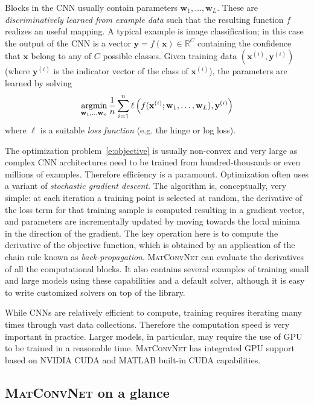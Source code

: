 \documentclass[12pt]{article}
\newcommand{\real}{\mathbb{R}}
\newcommand{\vlnn}{\textsc{MatConvNet}\xspace}
\newcommand{\bx}{\mathbf{x}}
\newcommand{\by}{\mathbf{y}}
\newcommand{\bw}{\mathbf{w}}
\newcommand{\argmin}{\operatornamewithlimits{argmin}}
\begin{document}
Blocks in the CNN usually contain parameters $\bw_1,\dots,\bw_L$. These are \emph{discriminatively learned from example data} such that the resulting function $f$ realizes an useful mapping. A typical example is image classification; in this case the output of the CNN is a vector $\by=f(\bx)\in\real^C$ containing the confidence that $\bx$ belong to any of $C$ possible classes. Given training data $(\bx^{(i)},\by^{(i)})$ (where $\by^{(i)}$ is the indicator vector of the class of $\bx^{(i)}$), the parameters are learned by solving
\begin{equation}\label{e:objective}
 \argmin_{\bw_1,\dots\bw_n}
 \frac{1}{n}\sum_{i=1}^n
 \ell\left(
 f(\bx^{(i)};\bw_1,\dots,\bw_L),
 \by^{(i)}
 \right)
\end{equation}
where $\ell$ is a suitable \emph{loss function} (e.g. the hinge or log loss).

The optimization problem~\eqref{e:objective} is usually non-convex and very large as complex CNN architectures need to be trained from hundred-thousands or even millions of examples. Therefore efficiency is a paramount. Optimization often uses a variant of \emph{stochastic gradient descent}. The algorithm is, conceptually, very simple: at each iteration a training point is selected at random, the derivative of the loss term for that training sample is computed resulting in a gradient vector, and parameters are incrementally updated by moving towards the local minima in the direction of the gradient. The key operation here is to compute the derivative of the objective function, which is obtained by an application of the chain rule known as \emph{back-propagation}. \vlnn can evaluate the derivatives of all the computational blocks. It also contains several examples of training small and large models using these capabilities and a default solver, although it is easy to write customized solvers on top of the library.

While CNNs are relatively efficient to compute, training requires iterating many times through vast data collections. Therefore the computation speed is very important in practice. Larger models, in particular, may require the use of GPU to be trained in a reasonable time. \vlnn has integrated GPU support based on NVIDIA CUDA and MATLAB built-in CUDA capabilities.

\subsection{\vlnn on a glance}\label{s:vlnn}
\end{document}
